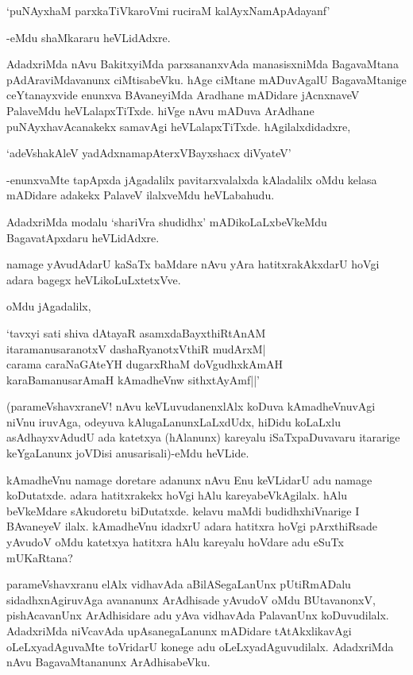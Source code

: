 \begin{shloka}
`puNAyxhaM parxkaTiVkaroVmi ruciraM kalAyxNamApAdayanf'
\end{shloka}

-eMdu shaMkararu heVLidAdxre.

AdadxriMda nAvu BakitxyiMda parxsananxvAda manasisxniMda BagavaMtana pAdAraviMdavanunx ciMtisabeVku. hAge ciMtane mADuvAgalU BagavaMtanige ceYtanayxvide enunxva BAvaneyiMda Aradhane mADidare jAcnxnaveV PalaveMdu heVLalapxTiTxde. hiVge nAvu mADuva ArAdhane puNAyxhavAcanakekx samavAgi heVLalapxTiTxde. hAgilalxdidadxre,

\begin{shloka}
`adeVshakAleV yadAdxnamapAterxVBayxshacx diVyateV'
\end{shloka}

-enunxvaMte tapApxda jAgadalilx pavitarxvalalxda kAladalilx oMdu kelasa mADidare adakekx PalaveV ilalxveMdu heVLabahudu.

AdadxriMda modalu `shariVra shudidhx' mADikoLaLxbeVkeMdu BagavatApxdaru heVLidAdxre.

namage yAvudAdarU kaSaTx baMdare nAvu yAra hatitxrakAkxdarU hoVgi adara bagegx heVLikoLuLxtetxVve.

oMdu jAgadalilx, 

\begin{shloka}
`tavxyi sati shiva dAtayaR asamxdaBayxthiRtAnAM\\
itaramanusaranotxV dashaRyanotxVthiR mudArxM|\\
carama caraNaGAteYH dugarxRhaM doVgudhxkAmAH\\
karaBamanusarAmaH kAmadheVnw sithxtAyAmf||'
\end{shloka}

(parameVshavxraneV! nAvu keVLuvudanenxlAlx koDuva kAmadheVnuvAgi niVnu iruvAga, odeyuva kAlugaLanunxLaLxdUdx, hiDidu koLaLxlu asAdhayxvAdudU ada katetxya (hAlanunx) kareyalu iSaTxpaDuvavaru itararige keYgaLanunx joVDisi anusarisali)-eMdu heVLide.

kAmadheVnu namage doretare adanunx nAvu Enu keVLidarU adu namage koDutatxde. adara hatitxrakekx hoVgi hAlu kareyabeVkAgilalx. hAlu beVkeMdare sAkudoretu biDutatxde. kelavu maMdi budidhxhiVnarige I BAvaneyeV ilalx. kAmadheVnu idadxrU adara hatitxra hoVgi pArxthiRsade yAvudoV oMdu katetxya hatitxra hAlu kareyalu hoVdare adu eSuTx mUKaRtana? 

parameVshavxranu elAlx vidhavAda aBilASegaLanUnx pUtiRmADalu sidadhxnAgiruvAga avananunx ArAdhisade yAvudoV oMdu BUtavanonxV, pishAcavanUnx ArAdhisidare adu yAva vidhavAda PalavanUnx koDuvudilalx. AdadxriMda niVcavAda upAsanegaLanunx mADidare tAtAkxlikavAgi oLeLxyadAguvaMte toVridarU konege adu oLeLxyadAguvudilalx. AdadxriMda nAvu BagavaMtananunx ArAdhisabeVku.

